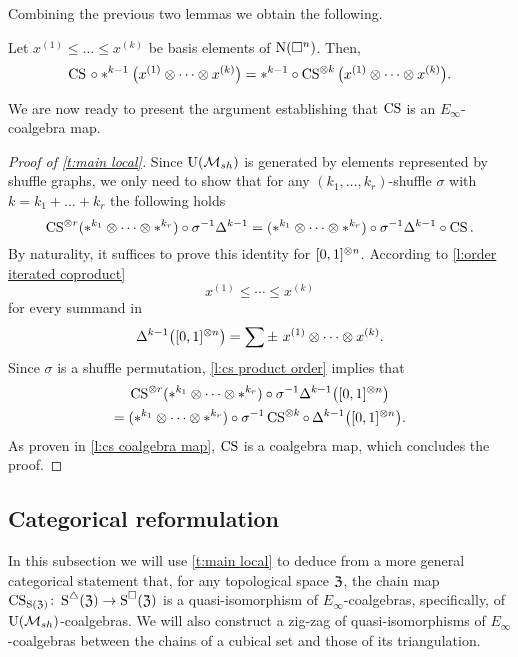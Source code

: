 Combining the previous two lemmas we obtain the following.

\begin{lemma} \label{l:cs product order}
	Let $x^{(1)} \leq \dots \leq x^{(k)}$ be basis elements of $\operatorname{N}(\square^n)$.
	Then,
	\[
	\operatorname{CS} \, \circ \ast^{k-1} \big( x^{(1)} \otimes \dotsb \otimes x^{(k)} \big)
	=
	\ast^{k-1} \circ \operatorname{CS}^{\otimes k} \big( x^{(1)} \otimes \dotsb \otimes x^{(k)} \big).
	\]
\end{lemma}

We are now ready to present the argument establishing that $\operatorname{CS}$ is an $E_\infty$-coalgebra map.

\begin{proof}[Proof of \cref{t:main local}]
	Since ${\operatorname{U}(\mathcal{M}_{sh})}$ is generated by elements represented by shuffle graphs, we only need to show that for any $(k_1,\dots,k_r)$-shuffle $\sigma$ with $k = k_1+\dots+k_r$ the following holds
	\[
	\operatorname{CS}^{\otimes r}(\ast^{k_1} \otimes \dotsb \otimes \ast^{k_r}) \circ \sigma^{-1} \Delta^{k-1} =
	(\ast^{k_1} \otimes \dotsb \otimes \ast^{k_r}) \circ \sigma^{-1} \Delta^{k-1} \circ \operatorname{CS}.
	\]
	By naturality, it suffices to prove this identity for $[0,1]^{\otimes n}$.
	According to \cref{l:order iterated coproduct}
	\[
	x^{(1)} \leq \cdots \leq x^{(k)}
	\]
	for every summand in
	\[
	\Delta^{k-1} \big([0,1]^{\otimes n}\big) =
	\sum \pm \ x^{(1)} \otimes \cdots \otimes x^{(k)}.
	\]
	Since $\sigma$ is a shuffle permutation, \cref{l:cs product order} implies that
	\begin{multline*}
		\operatorname{CS}^{\otimes r}(\ast^{k_1} \otimes \dotsb \otimes \ast^{k_r}) \circ \sigma^{-1} \Delta^{k-1} \big([0,1]^{\otimes n}\big) \\ =
		(\ast^{k_1} \otimes \dotsb \otimes \ast^{k_r}) \circ \sigma^{-1} \operatorname{CS}^{\otimes k} \circ \, \Delta^{k-1} \big([0,1]^{\otimes n}\big).
	\end{multline*}
	As proven in \cref{l:cs coalgebra map}, $\operatorname{CS}$ is a coalgebra map, which concludes the proof.
\end{proof}

\subsection{Categorical reformulation}

In this subsection we will use \cref{t:main local} to deduce from a more general categorical statement that, for any topological space $\mathfrak{Z}$, the chain map $\operatorname{CS}_{\operatorname{S}(\mathfrak{Z})} \colon \operatorname{\operatorname{S}^{\triangle}}(\mathfrak{Z}) \to \operatorname{\operatorname{S}^{\square}}(\mathfrak{Z})$ is a quasi-isomorphism of $E_\infty$-coalgebras, specifically, of ${\operatorname{U}(\mathcal{M}_{sh})}$-coalgebras.
We will also construct a zig-zag of quasi-isomorphisms of $E_\infty$-coalgebras between the chains of a cubical set and those of its triangulation.

